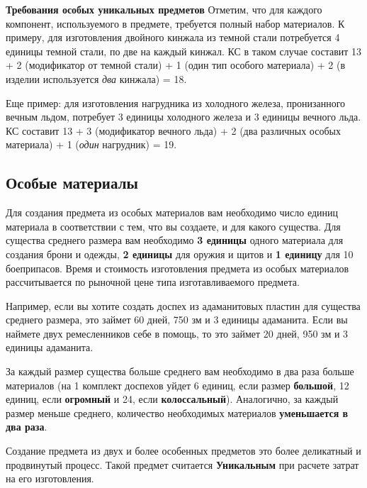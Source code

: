 \documentclass[a4paper, 9pt, twocolumn]{book}
\newenvironment {dndtable}
{
		\bigskip
		\centering
		\begin{tcolorbox}
			[enhanced, 
			sharp corners,
			colback=framecolor, 
			boxrule = 0pt, 
			overlay={
				\begin{tcbinvclipframe}
					\path[fill=black] ([xshift=10pt,yshift=7pt]frame.north west) --
					(frame.north west) --
					(frame.north east) --
					([xshift=-10pt, yshift=7pt]frame.north east) --
					([xshift=-10pt, yshift=2pt]frame.north east) --
					([xshift=10pt,yshift=2pt]frame.north west) -- cycle;
					
					\path[fill=black] ([xshift=10pt,yshift=-7pt]frame.south west) --
					(frame.south west) --
					(frame.south east) --
					([xshift=-10pt, yshift=-7pt]frame.south east) --
					([xshift=-10pt, yshift=-2pt]frame.south east) --
					([xshift=10pt,yshift=-2pt]frame.south west) -- cycle;
				\end{tcbinvclipframe}
			}
			]}
{\end{tcolorbox}}
\begin{document}
	\begin{dndtable}
		
		{\Large \textbf{Требования особых уникальных предметов}}
		Отметим, что для каждого компонент, используемого в предмете, требуется полный набор материалов. К примеру, для изготовления двойного кинжала из темной стали потребуется 4 единицы темной стали, по две на каждый кинжал. КС в таком случае составит 13 + 2 (модификатор от темной стали) + 1 (один тип особого материала) + 2 (в изделии используется \textit{два} кинжала) = 18.
		
		Еще пример: для изготовления нагрудника из холодного железа, пронизанного вечным льдом, потребует 3 единицы холодного железа и 3 единицы вечного льда. КС составит 13 + 3 (модификатор вечного льда) + 2 (два различных особых материала) + 1 (\textit{один} нагрудник) = 19.
		
	\end{dndtable}
	
	
	
	\subsection{Особые материалы}
	
	Для создания предмета из особых материалов вам необходимо число единиц материала в соответствии с тем, что вы создаете, и для какого существа. Для существа среднего размера вам необходимо \textbf{3 единицы} одного материала для создания брони и одежды, \textbf{2 единицы} для оружия и щитов и \textbf{1 единицу} для 10 боеприпасов. Время и стоимость изготовления предмета из особых материалов рассчитывается по рыночной цене типа изготавливаемого предмета.
	
	Например, если вы хотите создать доспех из адаманитовых пластин для существа среднего размера, это займет 60 дней, 750 зм и 3 единицы адаманита. Если вы наймете двух ремесленников себе в помощь, то это займет 20 дней, 950 зм и 3 единицы адаманита.
	
	За каждый размер существа больше среднего вам необходимо в два раза больше материалов (на 1 комплект доспехов уйдет 6 единиц, если размер \textbf{большой}, 12 единиц, если \textbf{огромный} и 24, если \textbf{колоссальный}). Аналогично, за каждый размер меньше среднего, количество необходимых материалов \textbf{уменьшается в два раза}.
	
	Создание предмета из двух и более особенных предметов это более деликатный и продвинутый процесс. Такой предмет считается \textbf{Уникальным} при расчете затрат на его изготовления.
	
\end{document}
